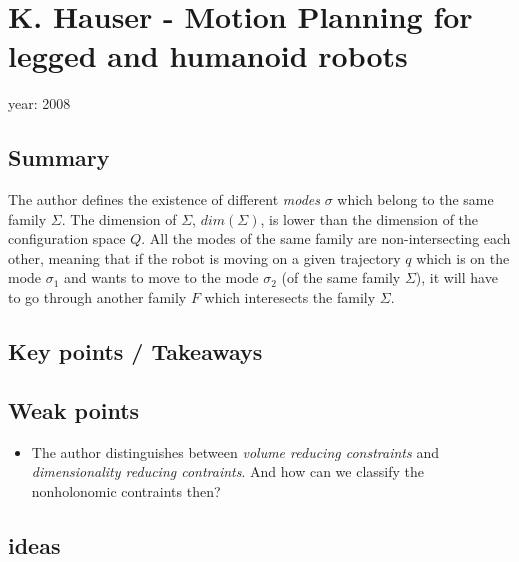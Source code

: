 \section{K. Hauser - Motion Planning for legged and humanoid robots \cite{Hauser2008}}
year: 2008
\subsection*{Summary}
The author defines the existence of different \textit{modes} $\sigma$ which belong to the same family $\Sigma$. The dimension of $\Sigma$, $dim(\Sigma)$, is lower than the dimension of the configuration space $Q$. All the modes of the same family are non-intersecting each other, meaning that if the robot is moving on a given trajectory $q$ which is on the mode $\sigma_1$ and wants to move to the mode $\sigma_2$ (of the same family $\Sigma$), it will have to go through another family $F$ which interesects the family $\Sigma$.
\subsection*{Key points / Takeaways}
\subsection*{Weak points}
\begin{itemize}
\item The author distinguishes between \textit{volume reducing constraints} and \textit{dimensionality reducing contraints}. And how can we classify the nonholonomic contraints then?
\end{itemize}

\subsection*{ideas}